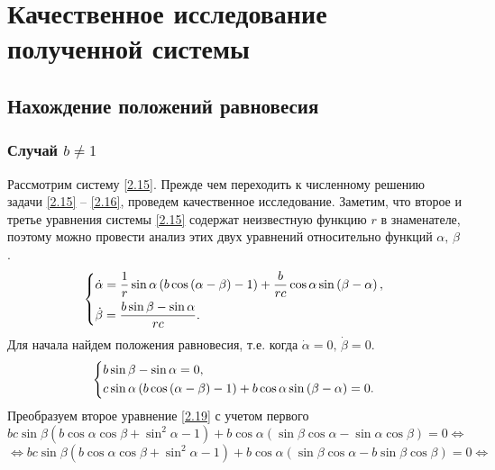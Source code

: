 \documentclass[a4paper,12pt, openany]{book}
\theoremstyle{plain} %
\theoremstyle{definition} %
\theoremstyle{remark} %
\numberwithin{equation}{chapter}
\begin{document}
{\section{Качественное исследование полученной системы}
\subsection{Нахождение положений равновесия}
\subsubsection*{Случай $b \neq 1$}

Рассмотрим систему \eqref{2.15}. Прежде чем переходить к численному решению задачи \eqref{2.15} -- \eqref{2.16}, проведем качественное исследование. Заметим, что второе и третье уравнения системы \eqref{2.15} содержат неизвестную функцию $r$ в знаменателе, поэтому можно провести анализ этих двух уравнений относительно функций $\alpha, \, \beta$.
\begin{equation}\label{2.18}
\left\{ {\begin{aligned}
   &\dot \alpha  = \frac{1}{r}\sin \alpha \left( {b\cos \left( {\alpha  - \beta } \right) - 1} \right) + \frac{b}{{rc}}\cos \alpha \sin \left( {\beta  - \alpha } \right), \hfill  \\
   &\dot \beta  = \frac{{b\sin \beta  - \sin \alpha }}{{rc}}. \hfill  \\
\end{aligned}} \right.
\end{equation}
Для начала найдем положения равновесия, т.е. когда $\dot{\alpha} = 0, \, \dot{\beta} = 0$. 
\begin{equation}\label{2.19}
\left\{ {\begin{aligned}
   &b\sin \beta  - \sin \alpha  = 0, \hfill  \\
   &c\sin \alpha \left( {b\cos \left( {\alpha  - \beta } \right) - 1} \right) + b\cos \alpha \sin \left( {\beta  - \alpha } \right) = 0. \hfill  \\
\end{aligned}} \right.
\end{equation}
Преобразуем второе уравнение \eqref{2.19} с учетом первого
\[
bc\sin \beta \left( {b\cos \alpha \cos \beta  + \sin ^2 \alpha  - 1} \right) + b\cos \alpha \left( {\sin \beta \cos \alpha  - \sin \alpha \cos \beta } \right) = 0 \Longleftrightarrow 
\]
\[
 \Longleftrightarrow bc\sin \beta \left( {b\cos \alpha \cos \beta  + \sin ^2 \alpha  - 1} \right) + b\cos \alpha \left( {\sin \beta \cos \alpha  - b\sin \beta \cos \beta } \right) = 0 \Longleftrightarrow 
\]}
\end{document}
